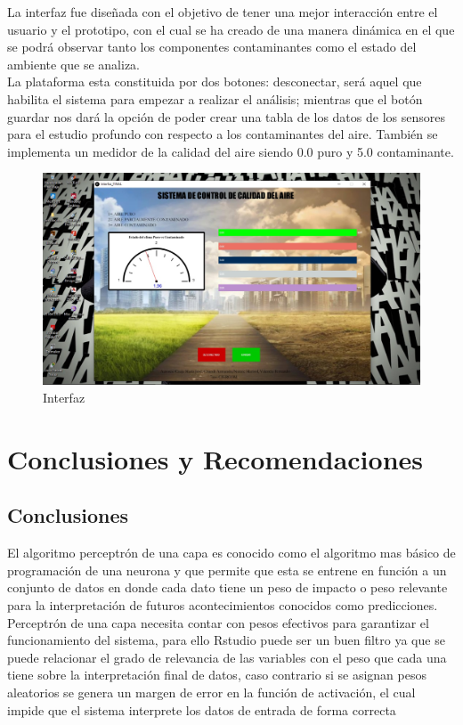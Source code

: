 \documentclass[10pt,a4paper]{article}
\begin{document}
La interfaz fue diseñada con el objetivo de tener una mejor interacción entre el usuario y el prototipo, con el cual se ha creado de una manera dinámica en el que se podrá observar tanto los componentes contaminantes como el estado del ambiente que se analiza.\\

La plataforma esta constituida por dos botones: desconectar, será aquel que habilita el sistema para empezar a realizar el análisis; mientras que el botón guardar nos dará la opción de poder crear una tabla de los datos de los sensores para el estudio profundo con respecto a los contaminantes del aire. También se implementa un medidor de la calidad del aire siendo 0.0 puro y 5.0 contaminante.

\begin{figure}[H]
\centering
\includegraphics[scale=0.30]{interfaz.JPEG}
\caption{Interfaz} 
\end{figure}

\section{Conclusiones y Recomendaciones}
\subsection{Conclusiones}

El algoritmo perceptrón de una capa es conocido como el algoritmo mas básico de programación de una neurona y que permite que esta se entrene en función a un conjunto de datos en donde cada dato tiene un peso de impacto o peso relevante para la interpretación de futuros acontecimientos conocidos como predicciones.\\

Perceptrón de una capa necesita contar con pesos efectivos para garantizar el funcionamiento del sistema, para ello Rstudio puede ser un buen filtro ya que se puede relacionar el grado de relevancia de las variables con el peso que cada una tiene sobre la interpretación final de datos, caso contrario si se asignan pesos aleatorios se genera un margen de error en la función de activación, el cual impide que el sistema interprete los datos de entrada de forma correcta  \\
\end{document}

